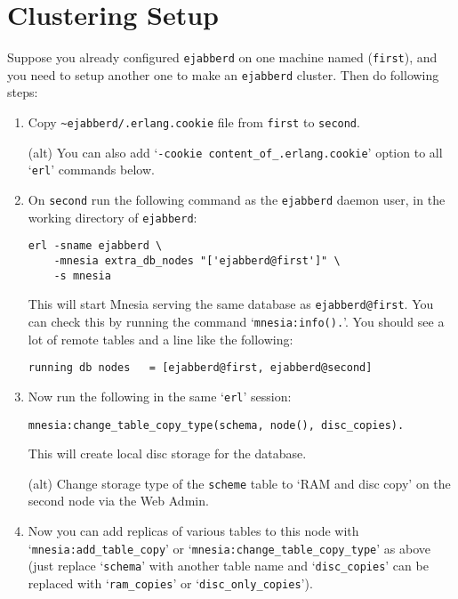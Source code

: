 \documentclass[a4paper,10pt]{book}
\newcommand{\ind}[1]{\begin{latexonly}\index{#1}\end{latexonly}}
\newcommand{\node}[1]{\texttt{#1}}
\newcommand{\term}[1]{\texttt{#1}}
\newcommand{\shell}[1]{\texttt{#1}}
\newcommand{\ejabberd}{\texttt{ejabberd}}
\begin{document}
\section{Clustering Setup}
\label{cluster}
\ind{clustering!setup}

Suppose you already configured \ejabberd{} on one machine named (\term{first}),
and you need to setup another one to make an \ejabberd{} cluster. Then do
following steps:

\begin{enumerate}
\item Copy \verb|~ejabberd/.erlang.cookie| file from \term{first} to
  \term{second}.

  (alt) You can also add `\verb|-cookie content_of_.erlang.cookie|'
  option to all `\shell{erl}' commands below.

\item On \term{second} run the following command as the \ejabberd{} daemon user,
  in the working directory of \ejabberd{}:

\begin{verbatim}
erl -sname ejabberd \
    -mnesia extra_db_nodes "['ejabberd@first']" \
    -s mnesia
\end{verbatim}

  This will start Mnesia serving the same database as \node{ejabberd@first}.
  You can check this by running the command `\verb|mnesia:info().|'. You
  should see a lot of remote tables and a line like the following:

\begin{verbatim}
running db nodes   = [ejabberd@first, ejabberd@second]
\end{verbatim}


\item Now run the following in the same `\shell{erl}' session:

\begin{verbatim}
mnesia:change_table_copy_type(schema, node(), disc_copies).
\end{verbatim}

  This will create local disc storage for the database.

  (alt) Change storage type of the \term{scheme} table to `RAM and disc
  copy' on the second node via the Web Admin.


\item Now you can add replicas of various tables to this node with
  `\verb|mnesia:add_table_copy|' or
  `\verb|mnesia:change_table_copy_type|' as above (just replace
  `\verb|schema|' with another table name and `\verb|disc_copies|'
  can be replaced with `\verb|ram_copies|' or
  `\verb|disc_only_copies|').


\end{enumerate}
\end{document}
